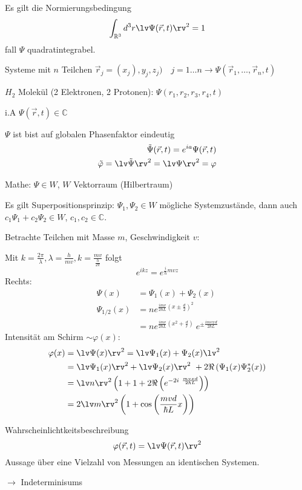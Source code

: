 Es gilt die Normierungsbedingung
\begin{equation*}
    \int_{\mathbb{R}^3} d^3 r \lv \Psi(\vec{r},t)\rv^2=1
\end{equation*}
fall $\Psi$ quadratintegrabel.
\begin{bem}
    \item 
    Systeme mit $n$ Teilchen $\vec{r}_j = (x_j),y_j,z_j) \quad j=1 \ldots
    n \rightarrow \Psi(\vec{r}_1, \ldots, \vec{r}_n,t)$

    $H_2$ Molekül (2 Elektronen, 2 Protonen): $\Psi(r_1,r_2,r_3,r_4,t)$ 
    \item
    i.A $\Psi(\vec{r},t) \in \mathbb{C}$
    \item
    $\Psi$ ist bist auf globalen Phasenfaktor eindeutig 
    \begin{align*}
        \tilde{\Psi}(\vec{r},t)=
        e^{ia} \Psi(\vec{r},t) \\
        \tilde{\varphi}=\lv \tilde{\Psi} \rv^2 = \lv \Psi \rv^2 = \varphi
    \end{align*}
    \item Mathe: $\Psi \in W$, $W$ Vektorraum (Hilbertraum)

    Es gilt Superpositionsprinzip: $\Psi_1, \Psi_2 \in W$ mögliche
    Systemzustände, dann auch $c_1 \Psi_1 + c_2 \Psi_2 \in W$, $c_1,c_2 \in
    \mathbb{C}$. 

    Betrachte Teilchen mit Masse $m$, Geschwindigkeit $v$:

    Mit
    $k=\frac{2\pi}{\lambda},\lambda=\frac{h}{mv},k=\frac{mv}{\frac{h}{2\pi}}$
    folgt
    \begin{equation*}
        e^{ikz} = e^{\frac{i}{\hbar}mvz}
    \end{equation*}
    Rechts:
    \begin{align*}
        \Psi(x) &= \Psi_1(x) + \Psi_2(x) \\
        \Psi_{1/2}(x) &= n e^{\frac{imv}{2\hbar L}\left(x \pm \frac{d}{2}\right)^2} \\
        &= n e^{\frac{imv}{2\hbar L}\left(x^2 + \frac{d}{r}\right)} \
        e^{\pm \frac{imvxd}{2\hbar L}}
    \end{align*}
    Intensität am Schirm $\sim \varphi(x)$:
    \begin{align*}
       \varphi(x) &= \lv \Psi(x) \rv^2 = \lv \Psi_1(x) + \Psi_2(x)\lv^2 \\
                &= \lv \Psi_1(x) \rv^2 + \lv \Psi_2(x) \rv^2 \
                    + 2\Re \left( \Psi_1(x) \Psi_2^*(x) \right) \\
                &= \lv n \rv^2  \left( 1 + 1 + 2\Re \left( e^{-2i \
                    \frac{mvxd}{2\hbar L}}\right) \right)\\
                &= 2 \lv m \rv^2 \left( 1 + \cos \left(\frac{mvd}{\hbar L}x \right) \right)
    \end{align*}
    \item \qme Wahrscheinlichtkeitsbeschreibung
    \begin{equation*}
        \varphi(\vec{r},t) = \lv \Psi(\vec{r},t)\rv^2
    \end{equation*}
    Aussage über eine Vielzahl von Messungen an identischen Systemen.

    $\longrightarrow$ Indeterminisums
\end{bem}
